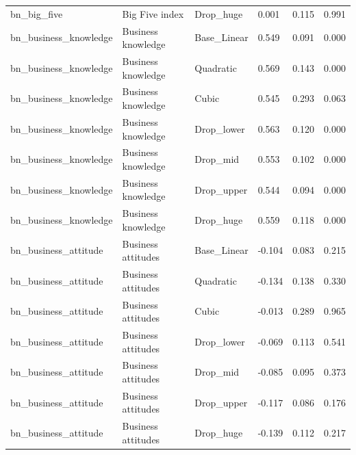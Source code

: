 \begin{tabular}{llllll}
bn\_big\_five & Big Five index & Drop\_huge & 0.001 & 0.115 & 0.991 \\
bn\_business\_knowledge & Business knowledge & Base\_Linear & 0.549 & 0.091 & 0.000 \\
bn\_business\_knowledge & Business knowledge & Quadratic & 0.569 & 0.143 & 0.000 \\
bn\_business\_knowledge & Business knowledge & Cubic & 0.545 & 0.293 & 0.063 \\
bn\_business\_knowledge & Business knowledge & Drop\_lower & 0.563 & 0.120 & 0.000 \\
bn\_business\_knowledge & Business knowledge & Drop\_mid & 0.553 & 0.102 & 0.000 \\
bn\_business\_knowledge & Business knowledge & Drop\_upper & 0.544 & 0.094 & 0.000 \\
bn\_business\_knowledge & Business knowledge & Drop\_huge & 0.559 & 0.118 & 0.000 \\
bn\_business\_attitude & Business attitudes & Base\_Linear & -0.104 & 0.083 & 0.215 \\
bn\_business\_attitude & Business attitudes & Quadratic & -0.134 & 0.138 & 0.330 \\
bn\_business\_attitude & Business attitudes & Cubic & -0.013 & 0.289 & 0.965 \\
bn\_business\_attitude & Business attitudes & Drop\_lower & -0.069 & 0.113 & 0.541 \\
bn\_business\_attitude & Business attitudes & Drop\_mid & -0.085 & 0.095 & 0.373 \\
bn\_business\_attitude & Business attitudes & Drop\_upper & -0.117 & 0.086 & 0.176 \\
bn\_business\_attitude & Business attitudes & Drop\_huge & -0.139 & 0.112 & 0.217 \\
\bottomrule
\end{tabular}
